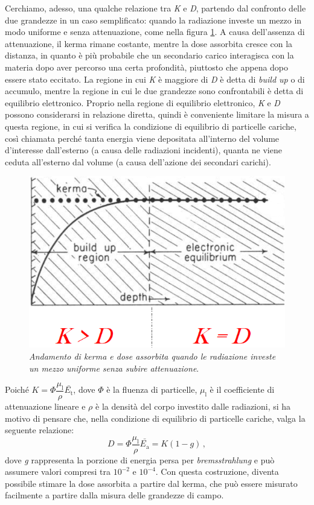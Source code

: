 \documentclass{report}
\newcommand{\figref}[1]{figura \ref{#1}}
\numberwithin{equation}{section}
\numberwithin{figure}{section}
\begin{document}
Cerchiamo, adesso, una qualche relazione tra \textit{K} e \textit{D}, partendo dal confronto delle due grandezze in un caso semplificato: quando la radiazione investe un mezzo in modo uniforme e senza attenuazione, come nella \figref{fig:kd}. A causa dell'assenza di attenuazione, il kerma rimane costante, mentre la dose assorbita cresce con la distanza, in quanto è più probabile che un secondario carico interagisca con la materia dopo aver percorso una certa profondità, piuttosto che appena dopo essere stato eccitato. La regione in cui \textit{K} è maggiore di \textit{D} è detta di \textit{build up} o di accumulo, mentre la regione in cui le due grandezze sono confrontabili è detta di equilibrio elettronico. Proprio nella regione di equilibrio elettronico, \textit{K} e \textit{D} possono considerarsi in relazione diretta, quindi è conveniente limitare la misura a questa regione, in cui si verifica la condizione di equilibrio di particelle cariche, così chiamata perché tanta energia viene depositata all'interno del volume d'interesse dall'esterno (a causa delle radiazioni incidenti), quanta ne viene ceduta all'esterno dal volume (a causa dell'azione dei secondari carichi).

\begin{figure}[htp]
\centering
\includegraphics[scale=0.8]{immagini/kd.png}
\caption{\label{fig:kd} \textit{Andamento di kerma e dose assorbita quando le radiazione investe un mezzo uniforme senza subire attenuazione}.}
\end{figure}

\noindent Poiché $K = \Phi \dfrac{\mu_\mathrm{l}}{\rho} \bar{E_\mathrm{t}}$, dove $\Phi$ è la fluenza di particelle, $\mu_\mathrm{l}$ è il coefficiente di attenuazione lineare e $\rho$ è la densità del corpo investito dalle radiazioni, si ha motivo di pensare che, nella condizione di equilibrio di particelle cariche, valga la seguente relazione:
\begin{equation}
    D = \Phi \dfrac{\mu_\mathrm{l}}{\rho} \bar{E_\mathrm{a}} = K(1-g)\,,
\end{equation}
dove \textit{g} rappresenta la porzione di energia persa per \textit{bremsstrahlung} e può assumere valori compresi tra $10^{-2}$ e $10^{-4}$. Con questa costruzione, diventa possibile stimare la dose assorbita a partire dal kerma, che può essere misurato facilmente a partire dalla misura delle grandezze di campo.
\end{document}
